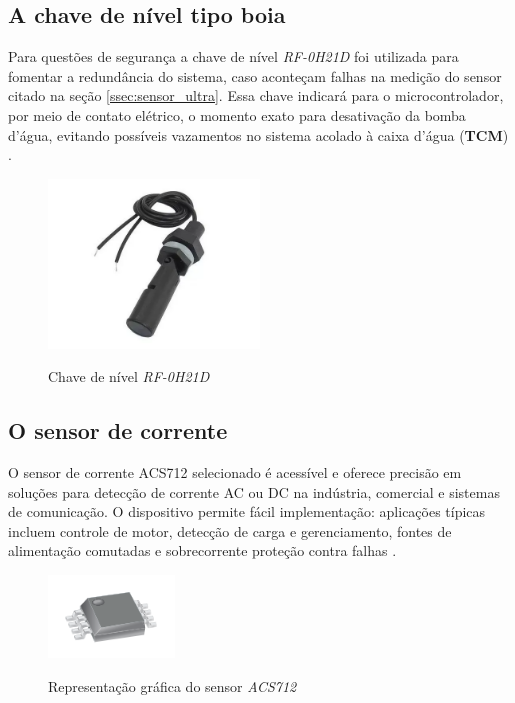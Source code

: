 \subsection{A chave de nível tipo boia}

Para questões de segurança a chave de nível \textit{RF-0H21D} foi utilizada para fomentar a redundância do sistema, caso aconteçam falhas na medição do sensor citado na seção \ref{ssec:sensor_ultra}. Essa chave indicará para o microcontrolador, por meio de contato elétrico, o momento exato para desativação da bomba d'água, evitando possíveis vazamentos no sistema acolado à caixa d'água (\textbf{TCM}) . 

\begin{figure}[H]
	\centering
	\caption{Chave de nível \textit{RF-0H21D}}
	\includegraphics[width=0.5\textwidth]{figuras/chave_boia.png}
	\label{fig:chaveboia}
\end{figure}


\subsection{O sensor de corrente}

O sensor de corrente ACS712 selecionado é acessível e oferece precisão em soluções para detecção de corrente AC ou DC na indústria,
comercial e sistemas de comunicação. O dispositivo permite fácil implementação: aplicações típicas incluem controle de motor, detecção de carga e gerenciamento, fontes de alimentação comutadas e sobrecorrente proteção contra falhas \cite{ACS712}.


\begin{figure}[H]
	\centering
	\caption{Representação gráfica do sensor \textit{ACS712}}
	\includegraphics[width=0.3\textwidth]{figuras/ACS712.png}
	\label{fig:acs712}
\end{figure} 


